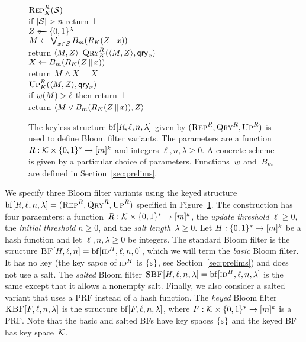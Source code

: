\begin{figure}
  {
    \underline{$\textnormal{\textsc{Rep}}^R_K(\mathcal{S})$}\\[2pt]
      if $|\mathcal{S}| > n$ return $\bot$\\
      $Z \mathrel{\leftarrow\mkern-14mu\leftarrow} \{0,1\}^\lambda$\\
      $M \gets \bigvee_{x \in \mathcal{S}} {B}_m(R_K(Z \, \| \, x))$\\
      return $\langle M, Z \rangle$
  }
  {
    \underline{$\textnormal{\textsc{Qry}}^R_K(\langle M, Z \rangle,\mathsf{qry}_x)$}\\[2pt]
      $X \gets {B}_m(R_K(Z \, \| \, x))$\\
      return $M \wedge X = X$
    \\[6pt]
    \underline{$\textnormal{\textsc{Up}}^R_K(\langle M, Z \rangle,\mathsf{qry}_x)$}\\[2pt]
      if ${w}(M) > \ell$ then return $\bot$\\
      return $\langle M \vee {B}_m(R_K(Z \, \| \, x)), Z \rangle$
  }
  \caption{The keyless structure $\mathrm{bf}[R,\ell,n,\lambda]$ given by
  $(\textnormal{\textsc{Rep}}^R,\textnormal{\textsc{Qry}}^R,\textnormal{\textsc{Up}}^R)$ is used to define Bloom filter variants. The
  parameters are a function $R: \mathcal{K}\times\{0,1\}^* \to [m]^k$ and integers $\ell, n,
  \lambda \geq0$. A concrete scheme is given by a particular choice of
  parameters.  Functions~${w}$ and~${B}_m$ are defined in
  Section~\ref{sec:prelims}.
  }
  \label{fig:bf-def}
\end{figure}


\medskip
We specify three Bloom filter variants using the keyed structure
$\mathrm{bf}[R,\ell,n,\lambda] = (\textnormal{\textsc{Rep}}^R,\textnormal{\textsc{Qry}}^R,\textnormal{\textsc{Up}}^R)$ specified in
Figure~\ref{fig:bf-def}.
%
The construction has four paraemters: a function~$R:\mathcal{K}\times\{0,1\}^*\to[m]^k$, the
\emph{update threshold} $\ell\geq0$, the \emph{initial threshold} $n\geq0$, and
the \emph{salt length}~$\lambda\geq0$.
%
Let $H:\{0,1\}^*\to[m]^k$ be a hash function and let $\ell, n, \lambda\geq0$ be
integers.
%
The standard Bloom filter is the structure $\textnormal{\textsc{BF}}[H,\ell,n] =
\mathrm{bf}[\textnormal{\textsc{id}}^H,\ell,n,0]$, which we will term the \emph{basic} Bloom filter. It
has no key (the key sapce of $\textnormal{\textsc{id}}^H$ is $\{\varepsilon\}$, see
Section~\ref{sec:prelims}) and does not use a salt.
%
The \emph{salted} Bloom filter $\textnormal{\textsc{SBF}}[H,\ell,n,\lambda] =
\mathrm{bf}[\textnormal{\textsc{id}}^H,\ell,n,\lambda]$ is the same except that it allows a nonempty salt.
%
Finally, we also consider a salted variant that uses a PRF instead of a hash
function. The \emph{keyed} Bloom filter $\textnormal{\textsc{KBF}}[F,\ell,n,\lambda]$ is the
structure $\mathrm{bf}[F,\ell,n,\lambda]$, where $F:\mathcal{K}\times\{0,1\}^*\to[m]^k$ is a
PRF.
%
Note that the basic and salted BFs have key spaces $\{\varepsilon\}$ and the keyed
BF has key space~$\mathcal{K}$.

